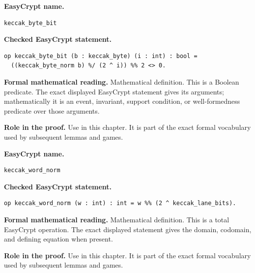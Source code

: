 \begin{formaldefinition}
\noindent\textbf{EasyCrypt name.}
\begin{lstlisting}[language=EasyCrypt,basicstyle=\ttfamily\scriptsize]
keccak_byte_bit
\end{lstlisting}
\noindent\textbf{Checked EasyCrypt statement.}
\begin{lstlisting}[language=EasyCrypt,basicstyle=\ttfamily\scriptsize]
op keccak_byte_bit (b : keccak_byte) (i : int) : bool =
  ((keccak_byte_norm b) %/ (2 ^ i)) %% 2 <> 0.
\end{lstlisting}
\noindent\textbf{Formal mathematical reading.}
Mathematical definition. This is a Boolean predicate.  The exact displayed EasyCrypt statement gives its arguments; mathematically it is an event, invariant, support condition, or well-formedness predicate over those arguments.

\noindent\textbf{Role in the proof.}
Use in this chapter. It is part of the exact formal vocabulary used by subsequent lemmas and games.

\end{formaldefinition}

\begin{formaldefinition}
\noindent\textbf{EasyCrypt name.}
\begin{lstlisting}[language=EasyCrypt,basicstyle=\ttfamily\scriptsize]
keccak_word_norm
\end{lstlisting}
\noindent\textbf{Checked EasyCrypt statement.}
\begin{lstlisting}[language=EasyCrypt,basicstyle=\ttfamily\scriptsize]
op keccak_word_norm (w : int) : int = w %% (2 ^ keccak_lane_bits).
\end{lstlisting}
\noindent\textbf{Formal mathematical reading.}
Mathematical definition. This is a total EasyCrypt operation.  The exact displayed statement gives the domain, codomain, and defining equation when present.

\noindent\textbf{Role in the proof.}
Use in this chapter. It is part of the exact formal vocabulary used by subsequent lemmas and games.

\end{formaldefinition}

